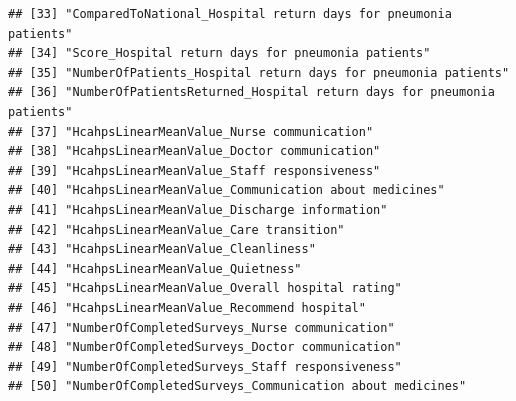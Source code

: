 \documentclass[
]{article}
\begin{document}
\begin{verbatim}
## [33] "ComparedToNational_Hospital return days for pneumonia patients"                                                                           
## [34] "Score_Hospital return days for pneumonia patients"                                                                                        
## [35] "NumberOfPatients_Hospital return days for pneumonia patients"                                                                             
## [36] "NumberOfPatientsReturned_Hospital return days for pneumonia patients"                                                                     
## [37] "HcahpsLinearMeanValue_Nurse communication"                                                                                                
## [38] "HcahpsLinearMeanValue_Doctor communication"                                                                                               
## [39] "HcahpsLinearMeanValue_Staff responsiveness"                                                                                               
## [40] "HcahpsLinearMeanValue_Communication about medicines"                                                                                      
## [41] "HcahpsLinearMeanValue_Discharge information"                                                                                              
## [42] "HcahpsLinearMeanValue_Care transition"                                                                                                    
## [43] "HcahpsLinearMeanValue_Cleanliness"                                                                                                        
## [44] "HcahpsLinearMeanValue_Quietness"                                                                                                          
## [45] "HcahpsLinearMeanValue_Overall hospital rating"                                                                                            
## [46] "HcahpsLinearMeanValue_Recommend hospital"                                                                                                 
## [47] "NumberOfCompletedSurveys_Nurse communication"                                                                                             
## [48] "NumberOfCompletedSurveys_Doctor communication"                                                                                            
## [49] "NumberOfCompletedSurveys_Staff responsiveness"                                                                                            
## [50] "NumberOfCompletedSurveys_Communication about medicines"                                                                                   

\end{verbatim}
\end{document}
